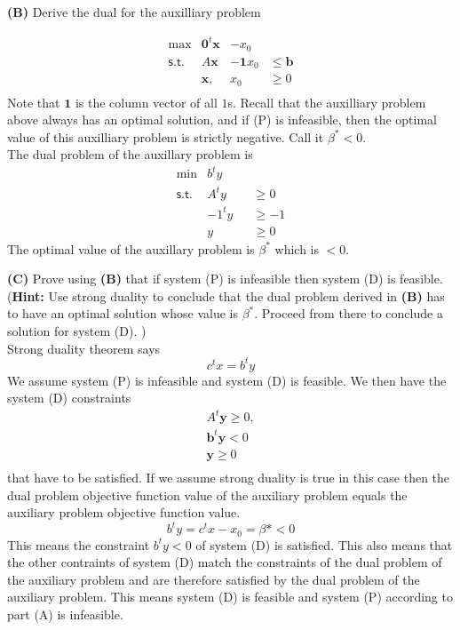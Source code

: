 \documentclass[11pt]{article}
\begin{document}
\noindent\textbf{(B)} Derive the dual for the auxilliary problem 

\[ \begin{array}{rlll}
\max & \mathbf{0}^t \mathbf{x}  &- x_0 \\
\mathsf{s.t.} & A \mathbf{x} &  - \mathbf{1} x_0 & \leq \mathbf{b} \\
& \mathbf{x},  & x_0 & \geq 0 \\
\end{array}\]
Note that $\mathbf{1}$ is the column vector of all $1$s.
Recall that the auxilliary problem above always has an optimal
solution, and if \textsf{(P)} is infeasible, then the optimal value of this
auxilliary problem is strictly negative. Call it $\beta^* < 0$.
\\
The dual problem of the auxillary problem is
\[ \begin{array}{rlll}
\min & b^ty \\
\mathsf{s.t.} 
& A^ty &  & \geq 0 \\
& -1^ty & & \geq -1 \\
& y & & \geq 0
\end{array}\]
The optimal value of the auxillary problem is $\beta^*$ which is $< 0$.

\medskip

\noindent\textbf{(C)} Prove using \textbf{(B)}  that if system 
\textsf{(P)} is infeasible then system \textsf{(D)} is feasible. (\textbf{Hint:} Use
strong duality to conclude that the dual problem derived in 
\textbf{(B)} has to have an optimal solution whose value
is $\beta^*$. Proceed from there to conclude a solution for system 
(D). )
\\
Strong duality theorem says
\[
c^tx = b^ty
\]
We assume system (P) is infeasible and system (D) is feasible.  We then have the system (D) constraints
\[ \begin{array}{l}
A^t \mathbf{y} \geq 0,\\
\mathbf{b}^t \mathbf{y} < 0\\
\mathbf{y} \geq 0 \\
\end{array}\]
that have to be satisfied.  If we assume strong duality is true in this case then the dual problem objective function value of the auxiliary problem equals the auxiliary problem objective function value.
\[
b^ty = c^tx - x_0 = \beta* < 0
\]
This means the constraint $b^ty < 0$ of system (D) is satisfied.  This also means that the other contraints of system (D) match the constraints of the dual problem of the auxiliary problem and are therefore satisfied by the dual problem of the auxiliary problem.  This means system (D) is feasible and system (P) according to part (A) is infeasible.
\end{document}
